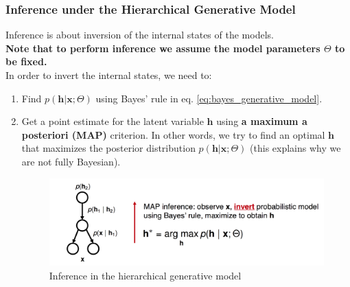 \documentclass[main]{subfiles}
\begin{document}
\subsubsection{Inference under the Hierarchical Generative Model}
Inference is about inversion of the internal states of the models.\\

\noindent
\textbf{Note that to perform inference we assume the model parameters $\Theta$ to be fixed.}\\

\noindent
In order to invert the internal states, we need to:
\begin{enumerate}
    \item Find $p(\bm{h}|\bm{x};\Theta)$ using Bayes' rule in eq. \ref{eq:bayes_generative_model}.
    \item Get a point estimate for the latent variable $\bm{h}$ using \textbf{a maximum a posteriori (MAP)} criterion. In other words, we try to find an optimal $\bm{h}$ that maximizes the posterior distribution $p(\bm{h}|\bm{x};\Theta)$ (this explains why we are not fully Bayesian).
        \begin{figure}[H]
            	\centering
            	\includegraphics[width=0.9\linewidth]{06_PredictionErrorsDuringPerceptionAndLearning/figures/hierarchical_MAP.png}
            	\caption{Inference in the hierarchical generative model} 
            	\label{fig:HGM_inference}
        \end{figure}
            
\end{enumerate}
\end{document}
